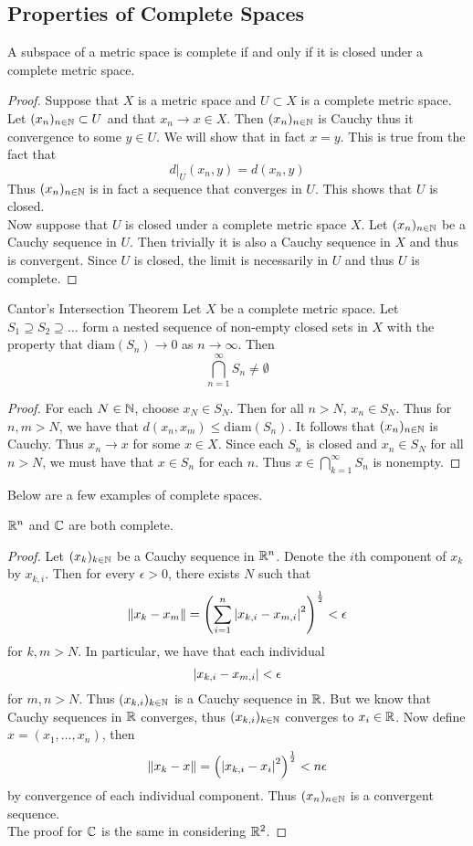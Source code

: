 \documentclass[a4paper]{article}
\begin{document}
\subsection{Properties of Complete Spaces}
\begin{prp}{}{} A subspace of a metric space is complete if and only if it is closed under a complete metric space. 
\begin{proof}
Suppose that $X$ is a metric space and $U\subset X$ is a complete metric space. Let $(x_n)_{n\in\mathbb{N}}\subset U$ and that $x_n\to x\in X$. Then $(x_n)_{n\in\mathbb{N}}$ is Cauchy thus it convergence to some $y\in U$. We will show that in fact $x=y$. This is true from the fact that $$d|_U(x_n,y)=d(x_n,y)$$ Thus $(x_n)_{n\in\mathbb{N}}$ is in fact a sequence that converges in $U$. This shows that $U$ is closed. \\
Now suppose that $U$ is closed under a complete metric space $X$. Let $(x_n)_{n\in\mathbb{N}}$ be a Cauchy sequence in $U$. Then trivially it is also a Cauchy sequence in $X$ and thus is convergent. Since $U$ is closed, the limit is necessarily in $U$ and thus $U$ is complete. 
\end{proof}
\end{prp}

\begin{thm}{Cantor's Intersection Theorem}{} Let $X$ be a complete metric space. Let $S_1\supseteq S_2\supseteq\dots$ form a nested sequence of non-empty closed sets in $X$ with the property that $\text{diam}(S_n)\to 0$ as $n\to\infty$. Then $$\bigcap_{n=1}^\infty S_n\neq\emptyset$$ 
\begin{proof}
For each $N\in\mathbb{N}$, choose $x_N\in S_N$. Then for all $n>N$, $x_n\in S_N$. Thus for $n,m>N$, we have that $d(x_n,x_m)\leq\text{diam}(S_n)$. It follows that $(x_n)_{n\in\mathbb{N}}$ is Cauchy. Thus $x_n\to x$ for some $x\in X$. Since each $S_n$ is closed and $x_n\in S_N$ for all $n>N$, we must have that $x\in S_n$ for each $n$. Thus $x\in\bigcap_{k=1}^\infty S_n$ is nonempty. 
\end{proof}
\end{thm}

Below are a few examples of complete spaces. 

\begin{prp}{}{} $\mathbb{R}^n$ and $\mathbb{C}$ are both complete. 
\begin{proof}
Let $(x_k)_{k\in\mathbb{N}}$ be a Cauchy sequence in $\mathbb{R}^n$. Denote the $i$th component of $x_k$ by $x_{k,i}$. Then for every $\epsilon>0$, there exists $N$ such that $$\|x_k-x_m\|=\left(\sum_{i=1}^n\abs{x_{k,i}-x_{m,i}}^2\right)^{\frac{1}{2}}<\epsilon$$ for $k,m>N$. In particular, we have that each individual $$\abs{x_{k,i}-x_{m,i}}<\epsilon$$ for $m,n>N$. Thus $(x_{k,i})_{k\in\mathbb{N}}$ is a Cauchy sequence in $\mathbb{R}$. But we know that Cauchy sequences in $\mathbb{R}$ converges, thus $(x_{k,i})_{k\in\mathbb{N}}$ converges to $x_i\in\mathbb{R}$. Now define $x=(x_1,\dots,x_n)$, then $$\|x_k-x\|=\left(\abs{x_{k,i}-x_i}^2\right)^{\frac{1}{2}}<n\epsilon$$ by convergence of each individual component. Thus $(x_n)_{n\in\mathbb{N}}$ is a convergent sequence. \\
The proof for $\mathbb{C}$ is the same in considering $\mathbb{R}^2$. 
\end{proof}
\end{prp}
\end{document}
